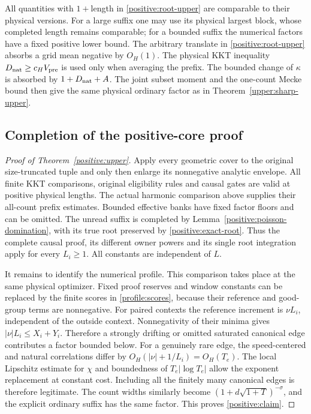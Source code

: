 All quantities with $1+$length in \eqref{positive:root-upper} are
comparable to their physical versions. For a large suffix one may use
its physical largest block, whose completed length remains comparable;
for a bounded suffix the numerical factors have a fixed positive lower
bound. The arbitrary translate in \eqref{positive:root-upper} absorbs
a grid mean negative by $O_H(1)$. The physical KKT
inequality $D_{\rm nat}\geq c_HV_{\rm pre}$ is used only when averaging
the prefix. The bounded change of $\kappa$ is absorbed by
$1+D_{\rm nat}+A$. The joint subset moment and the one-count Mecke bound
then give the same physical ordinary factor as in
Theorem~\ref{upper:sharp-upper}.

\subsection{Completion of the positive-core proof}
\begin{proof}[Proof of Theorem~\ref{positive:upper}]
Apply every geometric cover to the original size-truncated tuple and
only then enlarge its nonnegative analytic envelope. All finite KKT
comparisons, original eligibility rules and causal gates are valid at
positive physical lengths. The actual harmonic comparison above supplies
their all-count prefix estimates. Bounded effective banks have fixed
factor floors and can be omitted. The unread suffix is completed by
Lemma~\ref{positive:poisson-domination}, with its true root preserved by
\eqref{positive:exact-root}. Thus the complete causal proof, its
different owner powers and its single root integration apply for every
$L_i\geq1$. All constants are independent of $L$.

It remains to identify the numerical profile. This comparison takes
place at the same physical optimizer. Fixed proof reserves and window
constants can be replaced by the finite scores in
\eqref{profile:scores}, because their reference and good-group terms
are nonnegative. For paired contexts the reference increment is
$\nu L_i$, independent of the outside context. Nonnegativity of their
minima gives $|\nu|L_i\leq X_i+Y_i$. Therefore a strongly drifting or
omitted saturated canonical edge contributes a factor bounded below.
For a genuinely rare edge, the speed-centered and natural correlations
differ by $O_H(|\nu|+1/L_i)=O_H(T_e)$. The local Lipschitz estimate for
$\chi$ and boundedness of $T_e|\log T_e|$ allow the exponent replacement
at constant cost. Including all the finitely many canonical edges is
therefore legitimate. The count widths similarly become
$(1+d\sqrt{1+T})^{-\sigma}$, and the explicit ordinary suffix has the
same factor. This proves \eqref{positive:claim}.
\end{proof}

